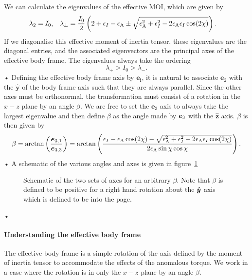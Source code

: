 \documentclass[../full_thesis/full_thesis.tex]{subfiles}
\newcommand{\thisdir}{../rotating_frame}
\begin{document}
We can calculate the eigenvalues of the effective MOI, which are given by
\begin{align}
\lambda_{2}=I_{0}, &&&
\lambda_{\pm}=\frac{I_{0}}{2}
\left(2+\epsilon_{I}-\epsilon_{\mathrm{A}}\pm
\sqrt{\epsilon_{\mathrm{A}}^{2}+\epsilon_{I}^{2}-2\epsilon_{\mathrm{A}}\epsilon_{I}\cos(2\chi)}\right).
\end{align}
If we diagonalise this effective moment of inertia tensor, these eigenvalues
are the diagonal entries, and the associated eigenvectors are the principal
axes of the effective body frame. The eigenvalues always take the ordering
\begin{equation}
\lambda_{+}>I_{0}>\lambda_{-}.
\end{equation}•
Defining the effective body frame axis by $\boldsymbol{e_{i}}$, it is natural to
associate $\boldsymbol{e}_{2}$ with the
$\boldsymbol{\hat{y}}$ of the body frame axis such that they are always
parallel. Since the other axes must be orthonormal, the transformation must
consist of a rotation in the $x-z$ plane by an angle $\beta$. We are
free to set the $\boldsymbol{e}_{3}$ axis to always take the largest eigenvalue
and then define $\beta$ as the angle made by $\boldsymbol{e}_{3}$ with the
$\hat{\boldsymbol{z}}$ axis. $\beta$ is then given by
\begin{equation}
\beta = \arctan\left(\frac{\boldsymbol{e}_{3,1}}{\boldsymbol{e}_{3,3}}\right)
=\arctan\left( \frac{ \epsilon_{I}-\epsilon_{\mathrm{A}}\cos(2\chi)-
              \sqrt{\epsilon_{\mathrm{A}}^{2}+\epsilon_{I}^{2}-2\epsilon_{\mathrm{A}}\epsilon_{I}\cos(2\chi)}}
              {2\epsilon_{\mathrm{A}}\sin\chi \cos\chi}\right).
\label{eqn: beta}
\end{equation}•
A schematic of the various angles and axes is given in
figure~\ref{fig: schematic}
\begin{figure}[ht]
\centering
 
\caption{Schematic of the two sets of axes for an arbitrary $\beta$. Note that
$\beta$ is defined to be positive for a right hand rotation about the $\boldsymbol{\hat{y}}$ axis
which is defined to be into the page.}
\label{fig: schematic}
\end{figure}•

\paragraph{Understanding the effective body frame}
The effective body frame is a simple rotation of the axis defined by the moment
of inertia tensor to accommodate the effects of the anomalous torque. We work
in a case where the rotation is in only the $x-z$ plane by an angle
$\beta$.
\end{document}

